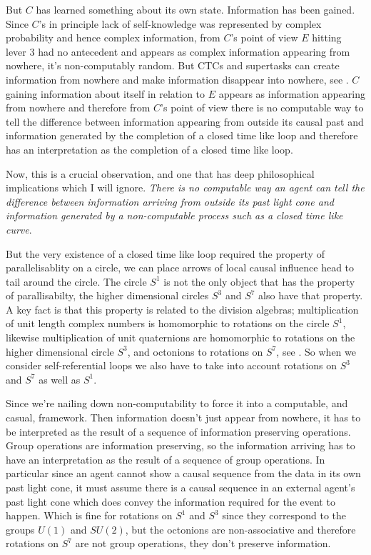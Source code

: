 But $C$ has learned something about its own state. Information has been gained. Since $C$'s in principle lack of self-knowledge was represented by complex probability and hence complex information, from $C$'s point of view $E$ hitting lever 3 had no antecedent and appears as complex information appearing from nowhere, it's non-computably random. But CTCs and supertasks can create information from nowhere and make information disappear into nowhere, see \autocite{Deutsch_91, Laraudogoitia_1997, Laraudogoitia1998}. $C$ gaining information about itself in relation to $E$ appears as information appearing from nowhere and therefore from $C$'s point of view there is no computable way to tell the difference between information appearing from outside its causal past and information generated by the completion of a closed time like loop and therefore has an interpretation as the completion of a closed time like loop.

Now, this is a crucial observation, and one that has deep philosophical implications which I will ignore. \label{prop:self-creation} \emph{There is no computable way an agent can tell the difference between information arriving from outside its past light cone and information generated by a non-computable process such as a closed time like curve}. 

But the very existence of a closed time like loop required the property of parallelisablity on a circle, we can place arrows of local causal influence head to tail around the circle. The circle $S^1$ is not the only object that has the property of parallisabilty, the higher dimensional circles $S^3$ and $S^7$ also have that property. A key fact is that this property is related to the division algebras; multiplication of unit length complex numbers is homomorphic to rotations on the circle $S^1$, likewise multiplication of unit quaternions are homomorphic to rotations on the higher dimensional circle $S^3$, and octonions to rotations on $S^7$, see \autocite{baez2002octonions}. So when we consider self-referential loops we also have to take into account rotations on $S^3$ and $S^7$ as well as $S^1$. 

Since we're nailing down non-computability to force it into a computable, and casual, framework. Then information doesn't just appear from nowhere, it has to be interpreted as the result of a sequence of information preserving operations. Group operations are information preserving, so the information arriving has to have an interpretation as the result of a sequence of group operations. In particular since an agent cannot show a causal sequence from the data in its own past light cone, it must assume there is a causal sequence in an external agent's past light cone which does convey the information required for the event to happen.  Which is fine for rotations on $S^1$ and $S^3$ since they correspond to the groups $U(1)$ and $SU(2)$, but the octonions are non-associative and therefore rotations on $S^7$ are not group operations, they don't preserve information. 

